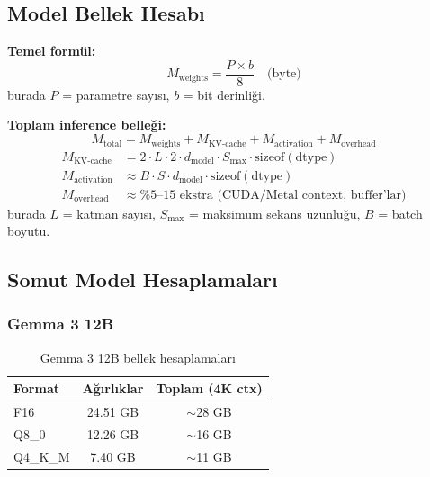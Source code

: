 \subsection{Model Bellek Hesab{\i}}
\label{sec:memory-calc}

\begin{formulbox}
\textbf{Temel form\"{u}l:}
\begin{equation}
M_{\text{weights}} = \frac{P \times b}{8} \quad \text{(byte)}
\label{eq:mem-weights}
\end{equation}
burada $P$ = parametre say{\i}s{\i}, $b$ = bit derinli\u{g}i.

\textbf{Toplam inference belle\u{g}i:}
\begin{equation}
M_{\text{total}} = M_{\text{weights}} + M_{\text{KV-cache}} + M_{\text{activation}} + M_{\text{overhead}}
\label{eq:mem-total}
\end{equation}
\begin{align}
M_{\text{KV-cache}} &= 2 \cdot L \cdot 2 \cdot d_{\text{model}} \cdot S_{\max} \cdot \text{sizeof}(\text{dtype}) \label{eq:kv-cache} \\
M_{\text{activation}} &\approx B \cdot S \cdot d_{\text{model}} \cdot \text{sizeof}(\text{dtype}) \label{eq:activation} \\
M_{\text{overhead}} &\approx \%5\text{--}15 \text{ ekstra (CUDA/Metal context, buffer'lar)} \label{eq:overhead}
\end{align}
burada $L$ = katman say{\i}s{\i}, $S_{\max}$ = maksimum sekans uzunlu\u{g}u, $B$ = batch boyutu.
\end{formulbox}


\subsection{Somut Model Hesaplamalar{\i}}
\label{sec:model-calculations}

\subsubsection{Gemma 3 12B}

\begin{table}[H]
\centering
\caption{Gemma 3 12B bellek hesaplamalar{\i}}
\label{tab:gemma-mem}
\begin{tabular}{lcc}
\toprule
\color{chapterBlue}\textbf{Format} &
\color{chapterBlue}\textbf{A\u{g}{\i}rl{\i}klar} &
\color{chapterBlue}\textbf{Toplam (4K ctx)} \\
\midrule
F16 & 24.51 GB & $\sim$28 GB \\
Q8\_0 & 12.26 GB & $\sim$16 GB \\
Q4\_K\_M & 7.40 GB & $\sim$11 GB \\
\bottomrule
\end{tabular}
\end{table}


